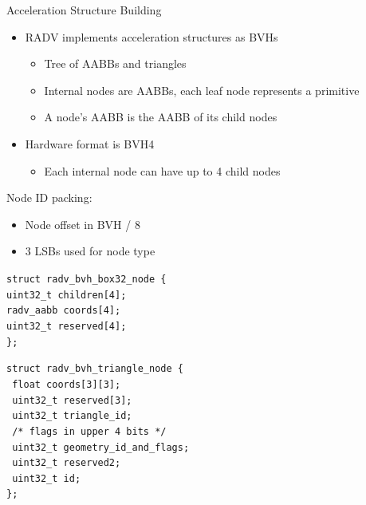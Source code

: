 \documentclass[aspectratio=169,t]{beamer}
\begin{document}
\begin{slide}{Acceleration Structure Building}
 \begin{itemize}
  \item RADV implements acceleration structures as BVHs
  \begin{itemize}
    \item Tree of AABBs and triangles
    \item Internal nodes are AABBs, each leaf node represents a primitive
    \item A node's AABB is the AABB of its child nodes
  \end{itemize}
  \item Hardware format is BVH4
  \begin{itemize}
    \item Each internal node can have up to 4 child nodes
  \end{itemize}
 \end{itemize}

 \begin{minipage}[t]{0.45\textwidth}
 \vspace*{2pt}
 Node ID packing:
 \begin{itemize}
  \item Node offset in BVH / 8
  \item 3 LSBs used for node type
 \end{itemize}

\texttt{struct radv\_bvh\_box32\_node \{\\
\hspace*{8pt} uint32\_t children[4];\\
\hspace*{8pt} radv\_aabb coords[4];\\
\hspace*{8pt} uint32\_t reserved[4];\\
\};}
 \end{minipage}
 \begin{minipage}[t]{0.5\textwidth}
\texttt{struct radv\_bvh\_triangle\_node \{}\\
\texttt{\hspace*{8pt} float coords[3][3];}\\
\texttt{\hspace*{8pt} uint32\_t reserved[3];}\\
\texttt{\hspace*{8pt} uint32\_t triangle\_id;}\\
\texttt{\hspace*{8pt} /* flags in upper 4 bits */}\\
\texttt{\hspace*{8pt} uint32\_t geometry\_id\_and\_flags;}\\
\texttt{\hspace*{8pt} uint32\_t reserved2;}\\
\texttt{\hspace*{8pt} uint32\_t id;}\\
\texttt{\};}
 \end{minipage}
\end{slide}
\end{document}
